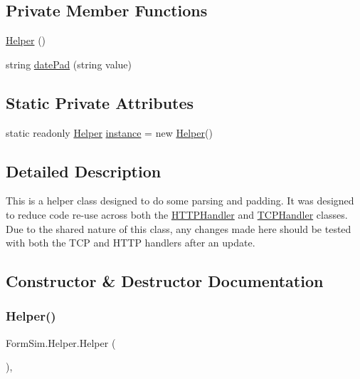 \subsection*{Private Member Functions}
\begin{DoxyCompactItemize}
\item 
\mbox{\hyperlink{class_form_sim_1_1_helper_a49fc4e03c9116e60aa1462c139f747ad}{Helper}} ()
\item 
string \mbox{\hyperlink{class_form_sim_1_1_helper_a5c4a7f2cdee7bb6466b8dd9f7ea11745}{date\+Pad}} (string value)
\end{DoxyCompactItemize}
\subsection*{Static Private Attributes}
\begin{DoxyCompactItemize}
\item 
static readonly \mbox{\hyperlink{class_form_sim_1_1_helper}{Helper}} \mbox{\hyperlink{class_form_sim_1_1_helper_a100712088360a52887cbecd891548038}{instance}} = new \mbox{\hyperlink{class_form_sim_1_1_helper}{Helper}}()
\end{DoxyCompactItemize}


\subsection{Detailed Description}
This is a helper class designed to do some parsing and padding. It was designed to reduce code re-\/use across both the \mbox{\hyperlink{class_form_sim_1_1_h_t_t_p_handler}{H\+T\+T\+P\+Handler}} and \mbox{\hyperlink{class_form_sim_1_1_t_c_p_handler}{T\+C\+P\+Handler}} classes. Due to the shared nature of this class, any changes made here should be tested with both the T\+CP and H\+T\+TP handlers after an update. 



\subsection{Constructor \& Destructor Documentation}
\mbox{\label{class_form_sim_1_1_helper_a49fc4e03c9116e60aa1462c139f747ad}} 
\subsubsection{\texorpdfstring{Helper()}{Helper()}}
{\footnotesize\ttfamily Form\+Sim.\+Helper.\+Helper (\begin{DoxyParamCaption}{ }\end{DoxyParamCaption})\hspace{0.3cm}{\ttfamily [inline]}, {\ttfamily [private]}}



